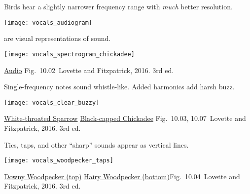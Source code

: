 \documentclass[t]{beamer}
\newcommand{\cornell}[1]{Fig.~#1~Lovette and Fitzpatrick, 2016. 3rd ed.}
\newcommand{\backskip}{\vspace{-0.5\baselineskip}}
\begin{document}

\begin{frame}{Birds hear a slightly narrower frequency range with \emph{much} better resolution.}


\texttt{[image: vocals\_audiogram]}

%
%
%
%

\end{frame}


\begin{frame}{ are visual representations of sound.}

\texttt{[image: vocals\_spectrogram\_chickadee]}

\vfilll

\tiny \href{https://youtu.be/baCamXF-610}{Audio} \hfill \cornell{10.02}
\end{frame}


\begin{frame}{Single-frequency notes sound whistle-like. Added harmonics add harsh buzz.}



\texttt{[image: vocals\_clear\_buzzy]}

\vfilll

\tiny \href{https://youtu.be/m5hHwTl8-Zo}{White-throated Sparrow} \quad \href{https://youtu.be/oNKb8rIYCoQ}{Black-capped Chickadee} \hfill \cornell{10.03, 10.07}
\end{frame}



\begin{frame}{Tics, taps, and other “sharp” sounds appear as vertical lines.}

\centering
\noindent \texttt{[image: vocals\_woodpecker\_taps]}

\vfilll

\tiny \href{https://youtu.be/ygT-Nk_eyJQ}{Downy Woodpecker (top)} \quad \href{https://youtu.be/GHwtWug4998}{Hairy Woodpecker (bottom)}\hfill \cornell{10.04}
\end{frame}
\end{document}
